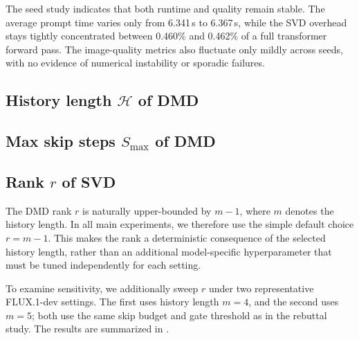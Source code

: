 The seed study indicates that
both runtime and quality remain stable.
The average prompt time varies only from 6.341\,s to 6.367\,s,
while the SVD overhead stays tightly concentrated
between 0.460\% and 0.462\% of a full transformer forward pass.
The image-quality metrics also fluctuate only mildly across seeds,
with no evidence of numerical instability or sporadic failures.




\subsection{History length $\mathcal{H}$ of DMD}\label{app:HistoryLengthDMD}



\subsection{Max skip steps $S_{\text{max}}$ of DMD}\label{app:MaxSkipStepsDMD}



\subsection{Rank $r$ of SVD}\label{app:Rank of SVD}

The DMD rank \(r\) is naturally upper-bounded by \(m-1\),
where \(m\) denotes the history length.
In all main experiments,
we therefore use the simple default choice \(r=m-1\).
This makes the rank a deterministic consequence
of the selected history length,
rather than an additional model-specific hyperparameter
that must be tuned independently for each setting.

To examine sensitivity,
we additionally sweep \(r\)
under two representative FLUX.1-dev settings.
The first uses history length \(m=4\),
and the second uses \(m=5\);
both use the same skip budget and gate threshold
as in the rebuttal study.
The results are summarized in .

